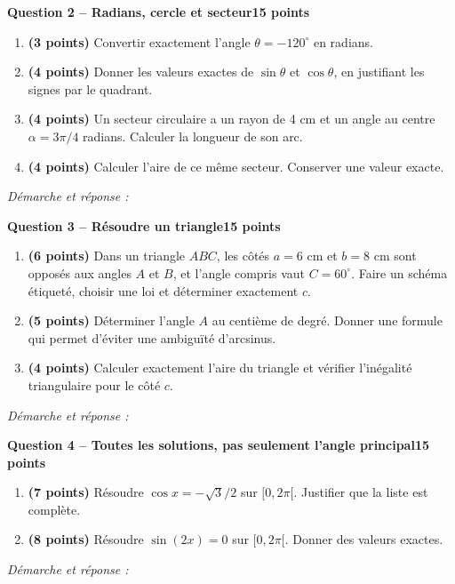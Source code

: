 \documentclass[11pt,a4paper]{article}
\begin{document}
\newpage
{\large\bfseries Question 2 -- Radians, cercle et secteur}\hfill\textbf{15 points}\par
\begin{enumerate}
\item \textbf{(3 points)} Convertir exactement l’angle \(\theta=-120^\circ\) en radians.
\item \textbf{(4 points)} Donner les valeurs exactes de \(\sin\theta\) et \(\cos\theta\), en justifiant les signes par le quadrant.
\item \textbf{(4 points)} Un secteur circulaire a un rayon de 4 cm et un angle au centre \(\alpha=3\pi/4\) radians. Calculer la longueur de son arc.
\item \textbf{(4 points)} Calculer l’aire de ce même secteur. Conserver une valeur exacte.
\end{enumerate}
\vspace{3mm}\textit{Démarche et réponse :}\par\vfill

\newpage
{\large\bfseries Question 3 -- Résoudre un triangle}\hfill\textbf{15 points}\par
\begin{enumerate}
\item \textbf{(6 points)} Dans un triangle \(ABC\), les côtés \(a=6\) cm et \(b=8\) cm sont opposés aux angles \(A\) et \(B\), et l’angle compris vaut \(C=60^\circ\). Faire un schéma étiqueté, choisir une loi et déterminer exactement \(c\).
\item \textbf{(5 points)} Déterminer l’angle \(A\) au centième de degré. Donner une formule qui permet d’éviter une ambiguïté d’arcsinus.
\item \textbf{(4 points)} Calculer exactement l’aire du triangle et vérifier l’inégalité triangulaire pour le côté \(c\).
\end{enumerate}
\vspace{3mm}\textit{Démarche et réponse :}\par\vfill

\newpage
{\large\bfseries Question 4 -- Toutes les solutions, pas seulement l’angle principal}\hfill\textbf{15 points}\par
\begin{enumerate}
\item \textbf{(7 points)} Résoudre \(\cos x=-\sqrt3/2\) sur \([0,2\pi[\). Justifier que la liste est complète.
\item \textbf{(8 points)} Résoudre \(\sin(2x)=0\) sur \([0,2\pi[\). Donner des valeurs exactes.
\end{enumerate}
\vspace{3mm}\textit{Démarche et réponse :}\par\vfill
\end{document}
